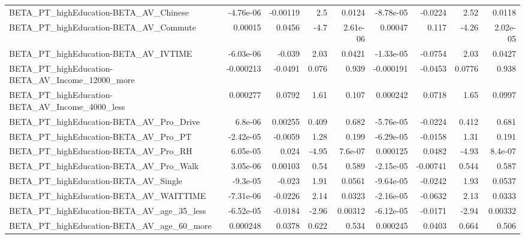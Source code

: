 \begin{tabular}{lrrrrrrrr}
BETA\_PT\_highEducation-BETA\_AV\_Chinese              &   -4.76e-06 &     -0.00119 &       2.5 &   0.0124 &  -8.78e-05 &     -0.0224 &         2.52 &        0.0118 \\
BETA\_PT\_highEducation-BETA\_AV\_Commute              &     0.00015 &       0.0456 &      -4.7 & 2.61e-06 &    0.00047 &       0.117 &        -4.26 &      2.02e-05 \\
BETA\_PT\_highEducation-BETA\_AV\_IVTIME               &   -6.03e-06 &       -0.039 &      2.03 &   0.0421 &  -1.33e-05 &     -0.0754 &         2.03 &        0.0427 \\
BETA\_PT\_highEducation-BETA\_AV\_Income\_12000\_more    &   -0.000213 &      -0.0491 &     0.076 &    0.939 &  -0.000191 &     -0.0453 &       0.0776 &         0.938 \\
BETA\_PT\_highEducation-BETA\_AV\_Income\_4000\_less     &    0.000277 &       0.0792 &      1.61 &    0.107 &   0.000242 &      0.0718 &         1.65 &        0.0997 \\
BETA\_PT\_highEducation-BETA\_AV\_Pro\_Drive            &     6.8e-06 &      0.00255 &     0.409 &    0.682 &  -5.76e-05 &     -0.0224 &        0.412 &         0.681 \\
BETA\_PT\_highEducation-BETA\_AV\_Pro\_PT               &   -2.42e-05 &      -0.0059 &      1.28 &    0.199 &  -6.29e-05 &     -0.0158 &         1.31 &         0.191 \\
BETA\_PT\_highEducation-BETA\_AV\_Pro\_RH               &    6.05e-05 &        0.024 &     -4.95 &  7.6e-07 &   0.000125 &      0.0482 &        -4.93 &       8.4e-07 \\
BETA\_PT\_highEducation-BETA\_AV\_Pro\_Walk             &    3.05e-06 &      0.00103 &      0.54 &    0.589 &  -2.15e-05 &    -0.00741 &        0.544 &         0.587 \\
BETA\_PT\_highEducation-BETA\_AV\_Single               &    -9.3e-05 &       -0.023 &      1.91 &   0.0561 &  -9.64e-05 &     -0.0242 &         1.93 &        0.0537 \\
BETA\_PT\_highEducation-BETA\_AV\_WAITTIME             &   -7.31e-06 &      -0.0226 &      2.14 &   0.0323 &  -2.16e-05 &     -0.0632 &         2.13 &        0.0333 \\
BETA\_PT\_highEducation-BETA\_AV\_age\_35\_less          &   -6.52e-05 &      -0.0184 &     -2.96 &  0.00312 &  -6.12e-05 &     -0.0171 &        -2.94 &       0.00332 \\
BETA\_PT\_highEducation-BETA\_AV\_age\_60\_more          &    0.000248 &       0.0378 &     0.622 &    0.534 &   0.000245 &      0.0403 &        0.664 &         0.506 \\

\end{tabular}
